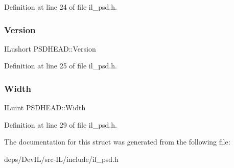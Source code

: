 Definition at line 24 of file il\+\_\+psd.\+h.

\mbox{\label{structPSDHEAD_a4df4bfadf77d503b4be25ce0152ad93c}} 
\subsubsection{\texorpdfstring{Version}{Version}}
{\footnotesize\ttfamily I\+Lushort P\+S\+D\+H\+E\+A\+D\+::\+Version}



Definition at line 25 of file il\+\_\+psd.\+h.

\mbox{\label{structPSDHEAD_ae3e87f8c79117e89e07b5f60f43677e0}} 
\subsubsection{\texorpdfstring{Width}{Width}}
{\footnotesize\ttfamily I\+Luint P\+S\+D\+H\+E\+A\+D\+::\+Width}



Definition at line 29 of file il\+\_\+psd.\+h.



The documentation for this struct was generated from the following file\+:\begin{DoxyCompactItemize}
\item 
deps/\+Dev\+I\+L/src-\/\+I\+L/include/il\+\_\+psd.\+h\end{DoxyCompactItemize}

